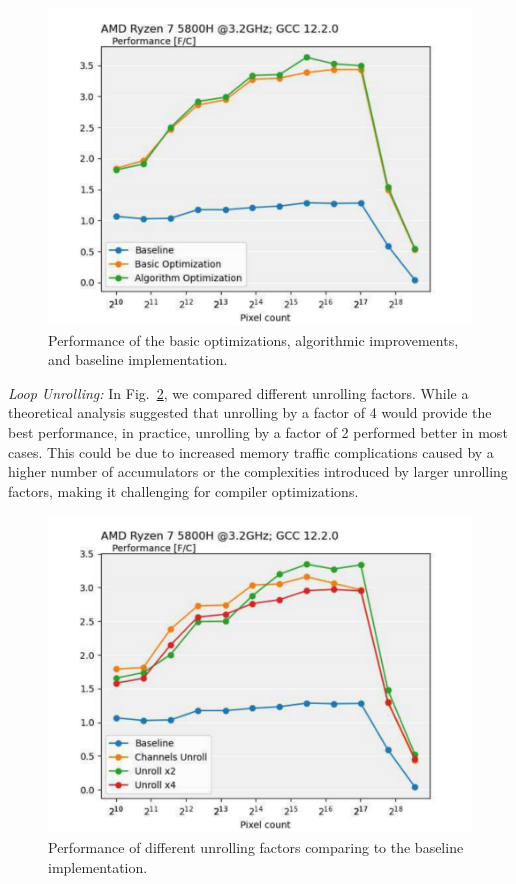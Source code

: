 \documentclass[letterpaper]{article}
\begin{document}
\begin{figure}[htbp]
\centering
  \includegraphics[scale=0.45]{PerfBasic.pdf}
  \caption{Performance of the basic optimizations, algorithmic improvements, and baseline implementation.\label{perfBase}}
\end{figure}

\textit{Loop Unrolling:} In Fig.~\ref{perfUnroll}, we compared different unrolling factors. While a theoretical analysis suggested that unrolling by a factor of 4 would provide the best performance, in practice, unrolling by a factor of 2 performed better in most cases. This could be due to increased memory traffic complications caused by a higher number of accumulators or the complexities introduced by larger unrolling factors, making it challenging for compiler optimizations. 

\begin{figure}[htbp]
\centering
  \includegraphics[scale=0.45]{PerfUnroll.pdf}
  \caption{Performance of different unrolling factors comparing to the baseline implementation.\label{perfUnroll}}
\end{figure}
\end{document}
